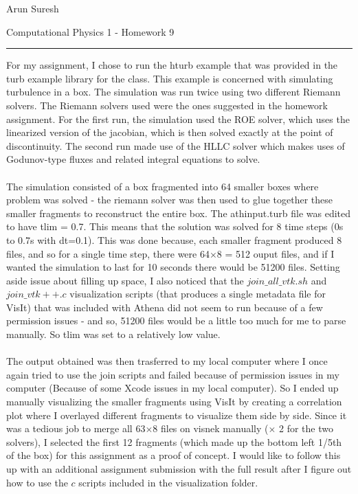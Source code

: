 \documentclass[12pt]{article}
\begin{document}
	Arun Suresh
	\begin{center}
		Computational Physics 1 - Homework 9
	\end{center} 
	{\rule{\linewidth}{0.1mm} }

For my assignment, I chose to run the hturb example that was provided in the turb example library for the class. This example is concerned with simulating turbulence in a box. The simulation was run twice using two different Riemann solvers. The Riemann solvers used were the ones suggested in the homework assignment. For the first run, the simulation used the ROE solver, which uses the linearized version of the jacobian, which is then solved exactly at the point of discontinuity. The second run made use of the HLLC solver which makes uses of Godunov-type fluxes and related integral equations to solve. \\\\
The simulation consisted of a box fragmented into 64 smaller boxes where problem was solved - the riemann solver was then used to glue together these smaller fragments to reconstruct the entire box. The athinput.turb file was edited to have tlim = 0.7. This means that the solution was solved for 8 time steps (0s to 0.7s with dt=0.1). This was done because, each smaller fragment produced 8 files, and so for a single time step, there were 64$\times$8 = 512 ouput files, and if I wanted the simulation to last for 10 seconds there would be 51200 files. Setting aside issue about filling up space, I also noticed that the $join\_all\_vtk.sh$ and $join\_vtk++.c$ visualization scripts (that produces a single metadata file for VisIt) that was included with Athena did not seem to run because of a few permission issues - and so, 51200 files would be a little too much for me to parse manually. So tlim was set to a relatively low value. \\\\
The output obtained was then trasferred to my local computer where I once again tried to use the join scripts and failed because of permission issues in my computer (Because of some Xcode issues in my local computer). So I ended up manually visualizing the smaller fragments using VisIt by creating a correlation plot where I overlayed different fragments to visualize them side by side. Since it was a tedious job to merge all 63$\times$8 files on visnek manually ($\times$ 2 for the two solvers), I selected the first 12 fragments (which made up the bottom left 1/5th of the box)	for this assignment as a proof of concept. I would like to follow this up with an additional assignment submission with the full result after I figure out how to use the $c$ scripts included in the visualization folder.\\\\
\end{document}
